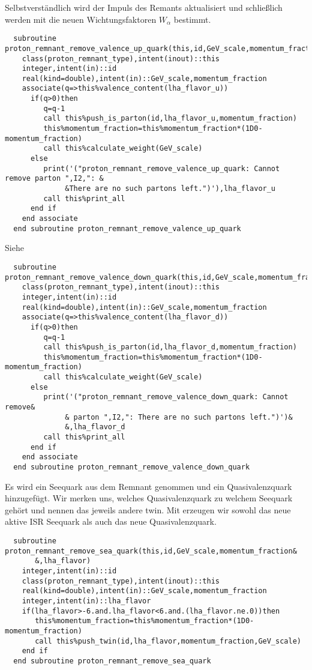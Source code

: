 Selbstverständlich wird der Impuls des Remants aktualisiert und schließlich werden mit\linebreak {} die neuen Wichtungsfaktoren $W_{\alpha}$ bestimmt.
\begin{Verbatim}
  subroutine proton_remnant_remove_valence_up_quark(this,id,GeV_scale,momentum_fraction)
    class(proton_remnant_type),intent(inout)::this
    integer,intent(in)::id
    real(kind=double),intent(in)::GeV_scale,momentum_fraction
    associate(q=>this%valence_content(lha_flavor_u))
      if(q>0)then
         q=q-1
         call this%push_is_parton(id,lha_flavor_u,momentum_fraction)
         this%momentum_fraction=this%momentum_fraction*(1D0-momentum_fraction)
         call this%calculate_weight(GeV_scale)
      else
         print('("proton_remnant_remove_valence_up_quark: Cannot remove parton ",I2,": &
              &There are no such partons left.")'),lha_flavor_u
         call this%print_all
      end if
    end associate
  end subroutine proton_remnant_remove_valence_up_quark
\end{Verbatim}
Siehe 
\begin{Verbatim}
  subroutine proton_remnant_remove_valence_down_quark(this,id,GeV_scale,momentum_fraction)
    class(proton_remnant_type),intent(inout)::this
    integer,intent(in)::id
    real(kind=double),intent(in)::GeV_scale,momentum_fraction
    associate(q=>this%valence_content(lha_flavor_d))
      if(q>0)then
         q=q-1
         call this%push_is_parton(id,lha_flavor_d,momentum_fraction)
         this%momentum_fraction=this%momentum_fraction*(1D0-momentum_fraction)
         call this%calculate_weight(GeV_scale)
      else
         print('("proton_remnant_remove_valence_down_quark: Cannot remove&
              & parton ",I2,": There are no such partons left.")')&
              &,lha_flavor_d
         call this%print_all
      end if
    end associate
  end subroutine proton_remnant_remove_valence_down_quark
\end{Verbatim}
Es wird ein Seequark aus dem Remnant genommen und ein Quasivalenzquark hinzugefügt. Wir merken uns, welches Quasivalenzquark zu welchem Seequark gehört und nennen das jeweils andere twin. Mit  erzeugen wir sowohl das neue aktive ISR Seequark als auch das neue Quasivalenzquark.
\begin{Verbatim}
  subroutine proton_remnant_remove_sea_quark(this,id,GeV_scale,momentum_fraction&
       &,lha_flavor)
    integer,intent(in)::id
    class(proton_remnant_type),intent(inout)::this
    real(kind=double),intent(in)::GeV_scale,momentum_fraction
    integer,intent(in)::lha_flavor
    if(lha_flavor>-6.and.lha_flavor<6.and.(lha_flavor.ne.0))then
       this%momentum_fraction=this%momentum_fraction*(1D0-momentum_fraction)
       call this%push_twin(id,lha_flavor,momentum_fraction,GeV_scale)
    end if
  end subroutine proton_remnant_remove_sea_quark
\end{Verbatim}
